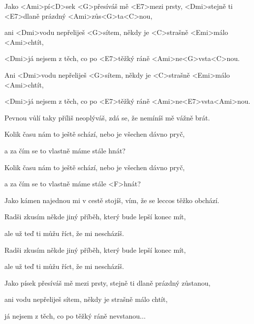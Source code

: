 

\zs
Jako <Ami>pí<D>sek <G>přesíváš mě <E7>mezi prsty,
<Dmi>stejně ti <E7>dlaně prázdný <Ami>zůs<G>ta<C>nou,

ani <Dmi>vodu nepřeliješ <G>sítem,
někdy je <C>strašně <Emi>málo <Ami>chtít,

<Dmi>já nejsem z těch, co po <E7>těžký ráně
<Ami>ne<G>vsta<C>nou.

Ani <Dmi>vodu nepřeliješ <G>sítem,
někdy je <C>strašně <Emi>málo <Ami>chtít,

<Dmi>já nejsem z těch, co po <E7>těžký ráně
<Ami>ne<E7>vsta<Ami>nou. \ks

\zs
Pevnou vůlí taky příliš neoplýváš, zdá se, že nemíníš mě vážně brát.

Kolik času nám to ještě schází, nebo je všechen dávno pryč,

a za čím se to vlastně máme stále hnát?

Kolik času nám to ještě schází, nebo je všechen dávno pryč,

a za čím se to vlastně máme stále <F>hnát?
\ks

\zs
Jako kámen najednou mi v cestě stojíš, vím, že se leccos těžko obchází.

Radši zkusím někde jiný příběh, který bude lepší konec mít,

ale už teď ti můžu říct, že mi nescházíš.

Radši zkusím někde jiný příběh, který bude lepší konec mít,

ale už teď ti můžu říct, že mi nescházíš.
\ks

\zs
Jako písek přesíváš mě mezi prsty, stejně ti dlaně prázdný zůstanou,

ani vodu nepřeliješ sítem, někdy je strašně málo chtít,

já nejsem z těch, co po těžký ráně nevstanou...
\ks

\kp

